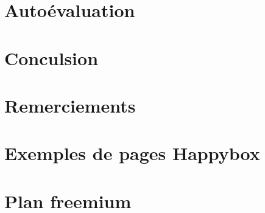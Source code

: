 \documentclass[11pt, a4paper ]{article}
\let\stdsection\section
\renewcommand\section{\newpage\stdsection}
\begin{document}
\begin{spacing}{1.5}
		\section{Autoévaluation}

	\section{Conculsion} %

	\section{Remerciements}

	\appendix
	\section{Exemples de pages Happybox}

	\section{Plan freemium}
	\printindex

	
	
\end{spacing}
\end{document}
